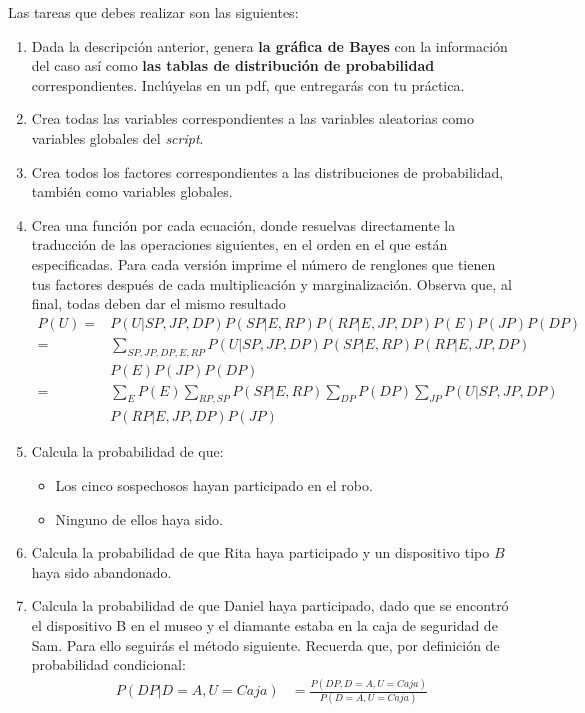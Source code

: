 Las tareas que debes realizar son las siguientes:
\begin{enumerate}
 \item Dada la descripción anterior, genera \textbf{la gráfica de Bayes} con la información del caso así como \textbf{las tablas de distribución de probabilidad} correspondientes.  Inclúyelas en un pdf, que entregarás con tu práctica.

 \item Crea todas las variables correspondientes a las variables aleatorias como variables globales del \textit{script}.
 
 \item Crea todos los factores correspondientes a las distribuciones de probabilidad, también como variables globales.
 
 \item Crea una función por cada ecuación, donde resuelvas directamente la traducción de las operaciones siguientes, en el orden en el que están especificadas.  Para cada versión imprime el número de renglones que tienen tus factores después de cada multiplicación y marginalización. Observa que, al final, todas deben dar el mismo resultado
 \begin{align}
  P(U) =& P(U|SP,JP,DP)P(SP|E,RP)P(RP|E,JP,DP)P(E)P(JP)P(DP) \\
       =& \sum_{SP,JP,DP,E,RP}P(U|SP,JP,DP)P(SP|E,RP)P(RP|E,JP,DP) \nonumber \\
        & P(E)P(JP)P(DP) \nonumber \\
       =& \sum_{E}P(E) \sum_{RP,SP}P(SP|E,RP) \sum_{DP}P(DP) \sum_{JP}P(U|SP,JP,DP) \nonumber \\
        & P(RP|E,JP,DP)P(JP) \nonumber
 \end{align}
 
 \item Calcula la probabilidad de que:
 \begin{itemize}
  \item Los cinco sospechosos hayan participado en el robo.
  \item Ninguno de ellos haya sido.
 \end{itemize}

 \item Calcula la probabilidad de que Rita haya participado y un dispositivo tipo $B$ haya sido abandonado.
 
 \item Calcula la probabilidad de que Daniel haya participado, dado que se encontró el dispositivo B en el museo y el diamante estaba en la caja de seguridad de Sam.  Para ello seguirás el método siguiente.
 Recuerda que, por definición de probabilidad condicional:
 \begin{align*}
   P(DP|D=A,U=Caja) &= \frac{P(DP,D=A,U=Caja)}{P(D=A,U=Caja)}
 \end{align*}
  

\end{enumerate}
